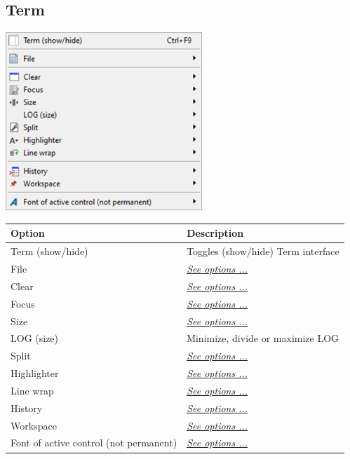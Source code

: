 \hypertarget{menu_r_term}{}
\subsection{Term}

\includegraphics[scale=0.50]{./res/menu_r_term.png} \\

\begin{scriptsize}
  \begin{tabularx}{\textwidth}{>{\hsize=0.7\hsize}X>{\hsize=0.7\hsize}X}\\
    \hline
    \textbf{Option} & \textbf{Description} \\
    \hline
    Term (show/hide) & Toggles (show/hide) Term interface \\
    \hdashline[1pt/1pt]
    File & \textit{\href{\#menu\_r\_term\_file}{See options ...}} \\
    \hdashline[1pt/1pt]
    Clear & \textit{\href{\#menu\_r\_term\_clear}{See options ...}} \\
    Focus & \textit{\href{\#menu\_r\_term\_focus}{See options ...}} \\
    Size & \textit{\href{\#menu\_r\_term\_size}{See options ...}} \\
    LOG (size) &  Minimize, divide or maximize LOG \\
    Split & \textit{\href{\#menu\_r\_term\_split}{See options ...}} \\
    Highlighter & \textit{\href{\#menu\_r\_term\_highlighter}{See options ...}} \\
    Line wrap & \textit{\href{\#menu\_r\_term\_linewrap}{See options ...}} \\
    \hdashline[1pt/1pt]
    History & \textit{\href{\#menu\_r\_term\_history}{See options ...}} \\
    Workspace & \textit{\href{\#menu\_r\_term\_workspace}{See options ...}} \\
    \hdashline[1pt/1pt]
    Font of active control (not permanent) & \textit{\href{\#menu\_r\_term\_fontsize}{See options ...}} \\
    \hline
  \end{tabularx}
\end{scriptsize}

